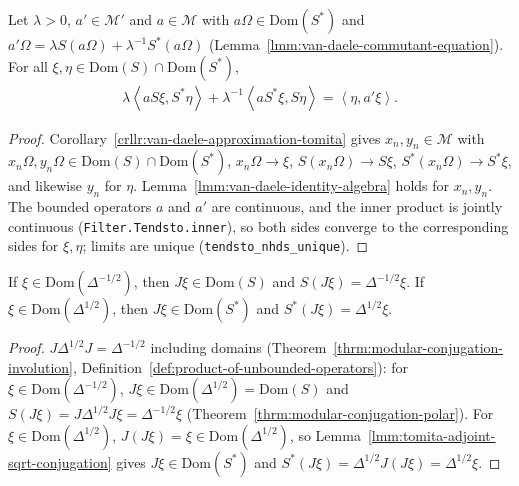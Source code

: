 \begin{lemma}
    \label{lmm:van-daele-sesquilinear-identity}
    \leanok
    Let $\lambda > 0$, $a' \in \mathcal{M}'$ and $a \in \mathcal{M}$ with $a\Omega \in \text{Dom}(S^*)$ and $a'\Omega = \lambda S(a\Omega) + \lambda^{-1}S^*(a\Omega)$ (Lemma~\ref{lmm:van-daele-commutant-equation}). For all $\xi, \eta \in \text{Dom}(S) \cap \text{Dom}(S^*)$,
    \begin{align}
        \lambda\left< aS\xi, S^*\eta \right> + \lambda^{-1}\left< aS^*\xi, S\eta \right> = \left< \eta, a'\xi \right>.
    \end{align}
\end{lemma}
\begin{proof}
    \leanok
    Corollary~\ref{crllr:van-daele-approximation-tomita} gives $x_n, y_n \in \mathcal{M}$ with $x_n\Omega, y_n\Omega \in \text{Dom}(S) \cap \text{Dom}(S^*)$, $x_n\Omega \to \xi$, $S(x_n\Omega) \to S\xi$, $S^*(x_n\Omega) \to S^*\xi$, and likewise $y_n$ for $\eta$. Lemma~\ref{lmm:van-daele-identity-algebra} holds for $x_n, y_n$. The bounded operators $a$ and $a'$ are continuous, and the inner product is jointly continuous (\texttt{Filter.Tendsto.inner}), so both sides converge to the corresponding sides for $\xi, \eta$; limits are unique (\texttt{tendsto\_nhds\_unique}).
\end{proof}

\begin{lemma}
    \label{lmm:tomita-operators-after-conjugation}
    \leanok
    If $\xi \in \text{Dom}(\Delta^{-1/2})$, then $J\xi \in \text{Dom}(S)$ and $S(J\xi) = \Delta^{-1/2}\xi$. If $\xi \in \text{Dom}(\Delta^{1/2})$, then $J\xi \in \text{Dom}(S^*)$ and $S^*(J\xi) = \Delta^{1/2}\xi$.
\end{lemma}
\begin{proof}
    \leanok
    $J\Delta^{1/2}J = \Delta^{-1/2}$ including domains (Theorem~\ref{thrm:modular-conjugation-involution}, Definition~\ref{def:product-of-unbounded-operators}): for $\xi \in \text{Dom}(\Delta^{-1/2})$, $J\xi \in \text{Dom}(\Delta^{1/2}) = \text{Dom}(S)$ and $S(J\xi) = J\Delta^{1/2}J\xi = \Delta^{-1/2}\xi$ (Theorem~\ref{thrm:modular-conjugation-polar}). For $\xi \in \text{Dom}(\Delta^{1/2})$, $J(J\xi) = \xi \in \text{Dom}(\Delta^{1/2})$, so Lemma~\ref{lmm:tomita-adjoint-sqrt-conjugation} gives $J\xi \in \text{Dom}(S^*)$ and $S^*(J\xi) = \Delta^{1/2}J(J\xi) = \Delta^{1/2}\xi$.
\end{proof}

